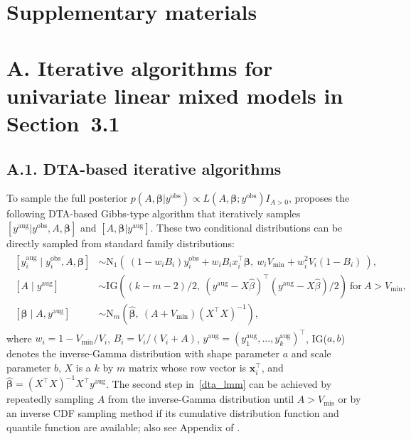 \documentclass[12pt]{article}
\begin{document}
\begin{appendix}
\setcounter{equation}{19}

\section{Supplementary materials}\label{sec1}

\section{A. Iterative algorithms for univariate linear mixed models in Section~3.1}

\subsection{A.1. DTA-based iterative algorithms}\label{app211}
To sample the  full posterior $p(A, \boldsymbol{\beta}\vert y^{\textrm{obs}})\propto L(A, \boldsymbol{\beta}; y^{\textrm{obs}})I_{A>0}$, \citet{kelly2014advances}  proposes the following DTA-based Gibbs-type algorithm that iteratively samples $[y^{\textrm{aug}}\vert y^{\textrm{obs}}, A, \boldsymbol{\beta}]$ and $[A, \boldsymbol{\beta}\vert y^{\textrm{aug}}]$. These two conditional distributions can be directly sampled from standard family distributions:
\begin{align}
\begin{aligned}\label{dta_lmm}
[y^{\textrm{aug}}_i\mid y^{\textrm{obs}}_i, A, \boldsymbol{\beta}] &\sim \textrm{N}_1\!\left(~(1-w_iB_i) y^{\textrm{obs}}_i+w_iB_ix^\top_i\boldsymbol{\beta},~ w_iV_{\textrm{min}}+w_i^2V_i(1-B_i)~\right),\\
[A\mid y^{\textrm{aug}}] &\sim \textrm{IG}\!\left((k-m-2)/2,~ (y^{\textrm{aug}}-X\hat{\beta})^\top(y^{\textrm{aug}}-X\hat{\beta})/2\right)~\textrm{for}~A>V_{\textrm{min}}, \\
[\boldsymbol{\beta}\mid A, y^{\textrm{aug}}] &\sim \textrm{N}_m\!\left(\hat{\boldsymbol{\beta}},~ (A+V_{\textrm{min}})(X^\top X)^{-1}\right),
\end{aligned}
\end{align}
where $w_i=1-V_{\textrm{min}}/V_i$, $B_i=V_i/(V_i+A)$, $y^{\textrm{aug}}=(y^{\textrm{aug}}_1, \ldots, y^{\textrm{aug}}_k)^\top$, IG($a, b$) denotes the inverse-Gamma distribution with shape parameter $a$ and scale parameter $b$, $X$ is a $k$ by $m$ matrix whose row vector is $\boldsymbol{x}^\top_i$, and $\hat{\boldsymbol{\beta}}=(X^\top X)^{-1}X^\top y^{\textrm{aug}}$. The second step in~\eqref{dta_lmm} can be achieved by repeatedly sampling $A$ from the inverse-Gamma distribution until $A>V_{\textrm{mis}}$ or by an inverse CDF sampling method if its cumulative distribution function and  quantile function are  available; also see Appendix of \cite{everson2000simulation}.  




\end{appendix}
\end{document}
